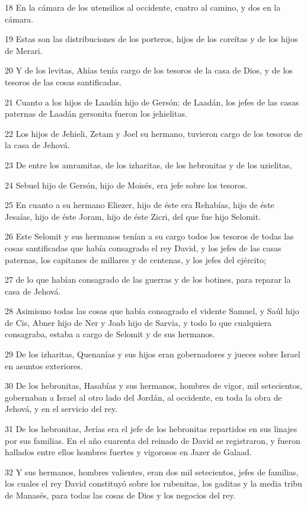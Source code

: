 \par 18 En la cámara de los utensilios al occidente, cuatro al camino, y dos en la cámara.
\par 19 Estas son las distribuciones de los porteros, hijos de los coreítas y de los hijos de Merari.
\par 20 Y de los levitas, Ahías tenía cargo de los tesoros de la casa de Dios, y de los tesoros de las cosas santificadas.
\par 21 Cuanto a los hijos de Laadán hijo de Gersón: de Laadán, los jefes de las casas paternas de Laadán gersonita fueron los jehielitas.
\par 22 Los hijos de Jehieli, Zetam y Joel su hermano, tuvieron cargo de los tesoros de la casa de Jehová.
\par 23 De entre los amramitas, de los izharitas, de los hebronitas y de los uzielitas,
\par 24 Sebuel hijo de Gersón, hijo de Moisés, era jefe sobre los tesoros.
\par 25 En cuanto a su hermano Eliezer, hijo de éste era Rehabías, hijo de éste Jesaías, hijo de éste Joram, hijo de éste Zicri, del que fue hijo Selomit.
\par 26 Este Selomit y sus hermanos tenían a su cargo todos los tesoros de todas las cosas santificadas que había consagrado el rey David, y los jefes de las casas paternas, los capitanes de millares y de centenas, y los jefes del ejército;
\par 27 de lo que habían consagrado de las guerras y de los botines, para reparar la casa de Jehová.
\par 28 Asimismo todas las cosas que había consagrado el vidente Samuel, y Saúl hijo de Cis, Abner hijo de Ner y Joab hijo de Sarvia, y todo lo que cualquiera consagraba, estaba a cargo de Selomit y de sus hermanos.
\par 29 De los izharitas, Quenanías y sus hijos eran gobernadores y jueces sobre Israel en asuntos exteriores.
\par 30 De los hebronitas, Hasabías y sus hermanos, hombres de vigor, mil setecientos, gobernaban a Israel al otro lado del Jordán, al occidente, en toda la obra de Jehová, y en el servicio del rey.
\par 31 De los hebronitas, Jerías era el jefe de los hebronitas repartidos en sus linajes por sus familias. En el año cuarenta del reinado de David se registraron, y fueron hallados entre ellos hombres fuertes y vigorosos en Jazer de Galaad.
\par 32 Y sus hermanos, hombres valientes, eran dos mil setecientos, jefes de familias, los cuales el rey David constituyó sobre los rubenitas, los gaditas y la media tribu de Manasés, para todas las cosas de Dios y los negocios del rey.

